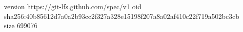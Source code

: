 version https://git-lfs.github.com/spec/v1
oid sha256:40b85612d7a0a2b93cc2f327a328e15198f207a8a02af410c22f719a502bc3cb
size 699076
